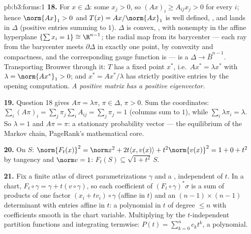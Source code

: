 \begin{solution}{pb:b3:forms:1}
\textbf{18.} For $x \in \Delta$: some $x_j > 0$, so $(Ax)_i
\geq A_{ij}x_j > 0$ for every $i$; hence $\norm{Ax}_1 > 0$
and $T(x) = Ax/\norm{Ax}_1$ is well defined, , and
lands in $\Delta$ (positive entries summing to $1$).
$\Delta$ is convex, , with nonempty  in the
affine hyperplane $\{\sum x_i = 1\} \cong \R^{n-1}$; the
radial map from its barycenter --- each ray from the
barycenter meets $\partial\Delta$ in exactly one point, by
convexity and compactness, and the corresponding gauge
function is  --- is a  $\Delta \to
\bar B^{n-1}$. Transporting Brouwer through it: $T$ has a
fixed point $x^*$, i.e.\ $Ax^* = \lambda x^*$ with $\lambda
= \norm{Ax^*}_1 > 0$; and $x^* = Ax^*/\lambda$ has strictly
positive entries by the opening computation. \emph{A
positive matrix has a positive eigenvector.}

\textbf{19.} Question 18 gives $A\pi = \lambda\pi$, $\pi \in
\Delta$, $\pi > 0$. Sum the coordinates: $\sum_i(A\pi)_i =
\sum_j\pi_j\sum_iA_{ij} = \sum_j\pi_j = 1$ (columns sum to
$1$), while $\sum_i\lambda\pi_i = \lambda$. So $\lambda = 1$
and $A\pi = \pi$: a stationary probability vector --- the
equilibrium of the Markov chain, PageRank's mathematical
core.

\textbf{20.} On $S$: $\norm{F_t(x)}^2 = \norm x^2 +
2t\langle x, v(x)\rangle + t^2\norm{v(x)}^2 = 1 + 0 + t^2$
by tangency and $\norm v = 1$: $F_t(S) \subseteq
\sqrt{1+t^2}\,S$.

\textbf{21.} Fix a finite atlas of direct parametrizations
$\gamma$ and a , independent of $t$. In a
chart, $F_t\circ\gamma = \gamma + t(v\circ\gamma)$, so each
coefficient of $(F_t\circ\gamma)^*\sigma$ is a sum of
products of one factor $(x_i + tv_i)\circ\gamma$ (affine in
$t$) and an $(n-1)\times(n-1)$ determinant with entries
affine in $t$: a polynomial in $t$ of degree $\leq n$ with
coefficients smooth in the chart variable. Multiplying by
the $t$-independent partition functions and integrating
termwise: $P(t) = \sum_{k=0}^n c_kt^k$, a polynomial.


\end{solution}
